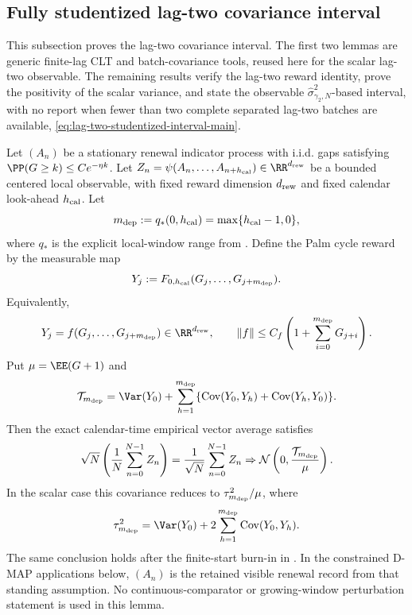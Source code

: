 
\subsection{Fully studentized lag-two covariance interval}\label{subsec:studentized-lag-two-main}

This subsection proves the lag-two covariance interval.  The first two lemmas
are generic finite-lag CLT and batch-covariance tools, reused here for the
scalar lag-two observable.  The remaining results verify the lag-two reward
identity, prove the positivity of the scalar variance, and state the observable
\(\widehat\sigma^2_{\gamma_2,N}\)-based interval, with no report when fewer
than two complete separated lag-two batches are available,
\eqref{eq:lag-two-studentized-interval-main}.

\begin{lemma}\label{lem:finite-lag-renewal-reward-main}
Let \((A_n)\) be a stationary renewal indicator process with i.i.d. gaps
satisfying \(\PP(G\ge k)\le Ce^{-\eta k}\).  Let
\(Z_n=\psi(A_n,\ldots,A_{n+h_{\rm cal}})\in\RR^{d_{\rm rew}}\) be a bounded
centered local observable, with fixed reward dimension \(d_{\rm rew}\) and
fixed calendar look-ahead \(h_{\rm cal}\).  Let
\[
m_{\rm dep}:=q_*(0,h_{\rm cal})=\max\{h_{\rm cal}-1,0\},
\]
where \(q_*\) is the explicit local-window range from
.  Define the Palm
cycle reward by the measurable map
\[
Y_j:=F_{0,h_{\rm cal}}(G_j,\ldots,G_{j+m_{\rm dep}}).
\]
Equivalently,
\[
Y_j=f(G_j,\ldots,G_{j+m_{\rm dep}})\in\RR^{d_{\rm rew}},\qquad
\|f\|\le C_f\left(1+\sum_{i=0}^{m_{\rm dep}}G_{j+i}\right).
\]
Put \(\mu=\EE(G+1)\) and
\[
\mathcal T_{m_{\rm dep}}=
\Var(Y_0)+
\sum_{h=1}^{m_{\rm dep}}\{\operatorname{Cov}(Y_0,Y_h)+\operatorname{Cov}(Y_h,Y_0)\}.
\]
Then the exact calendar-time empirical vector average satisfies
\[
\sqrt N\left(\frac1N\sum_{n=0}^{N-1}Z_n\right)
=\frac1{\sqrt N}\sum_{n=0}^{N-1}Z_n
\Rightarrow
\mathcal N\left(0,\frac{\mathcal T_{m_{\rm dep}}}{\mu}\right).
\]
In the scalar case this covariance reduces to \(\tau_{m_{\rm dep}}^2/\mu\),
where
\[
\tau_{m_{\rm dep}}^2=\Var(Y_0)+2\sum_{h=1}^{m_{\rm dep}}\operatorname{Cov}(Y_0,Y_h).
\]
The same conclusion holds after the finite-start burn-in in
.  In the constrained D-MAP
applications below, \((A_n)\) is the retained visible renewal record from that
standing assumption.  No continuous-comparator or growing-window perturbation
statement is used in this lemma.
\end{lemma}

